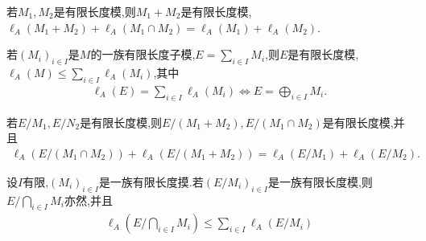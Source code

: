 \begin{corollary}{}{}
	若$M_{1},M_{2}$是有限长度模,则$M_{1}+M_{2}$是有限长度模,$\ell_{A}\left(M_{1}+M_{2}\right)+\ell_{A}\left(M_{1}\cap M_{2}\right)=\ell_{A}\left(M_{1}\right)+\ell_{A}\left(M_{2}\right)$.
\end{corollary}

\begin{corollary}{}{}
	若$\left(M_{i}\right)_{i\in I}$是$M$的一族有限长度子模,$E=\sum\limits_{i\in I}M_{i}$,则$E$是有限长度模,$\ell_{A}\left(M\right)\leqslant\sum\limits_{i\in I}\ell_{A}\left(M_{i}\right)$,其中
	\begin{align*}
		\ell_{A}\left(E\right)=\sum\limits_{i\in I}\ell_{A}\left(M_{i}\right)\iff E=\bigoplus\limits_{i\in I}M_{i}.
	\end{align*}
\end{corollary}

\begin{corollary}{}{}
	若$E/M_{1},E/N_{2}$是有限长度模,则$E/\left(M_{1}+M_{2}\right),E/\left(M_{1}\cap M_{2}\right)$是有限长度模,并且
	\begin{align*}
		\ell_{A}\left(E/\left(M_{1}\cap M_{2}\right)\right)+\ell_{A}\left(E/\left(M_{1}+M_{2}\right)\right)=\ell_{A}\left(E/M_{1}\right)+\ell_{A}\left(E/M_{2}\right).
	\end{align*}
\end{corollary}

\begin{corollary}{}{}
	设$I$有限,$\left(M_{i}\right)_{i\in I}$是一族有限长度摸.若$\left(E/M_{i}\right)_{i\in I}$是一族有限长度模,则$E/\bigcap\limits_{i\in I}M_{i}$亦然,并且
	\begin{align*}
		\ell_{A}\left(E/\bigcap\limits_{i\in I}M_{i}\right)\leqslant\sum\limits_{i\in I}\ell_{A}\left(E/M_{i}\right)
	\end{align*}
\end{corollary}
